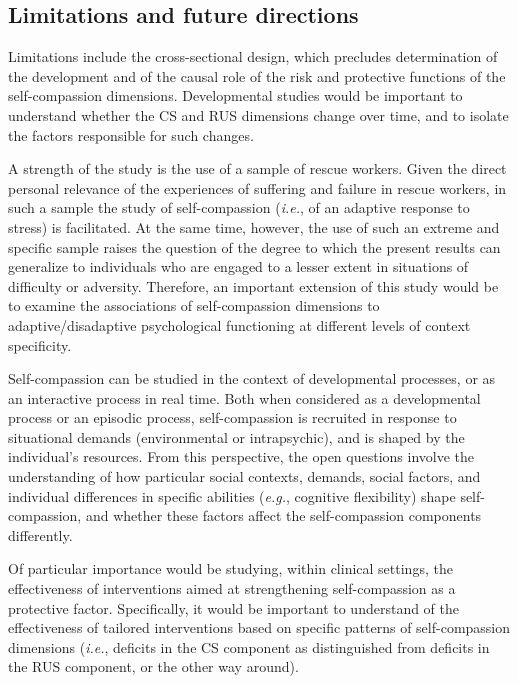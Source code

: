 \documentclass[
  english,
  man,floatsintext]{apa7}
\begin{document}
\hypertarget{limitations-and-future-directions}{%
\subsection{Limitations and future directions}\label{limitations-and-future-directions}}

Limitations include the cross-sectional design, which precludes determination of the development and of the causal role of the risk and protective functions of the self-compassion dimensions. Developmental studies would be important to understand whether the CS and RUS dimensions change over time, and to isolate the factors responsible for such changes.

A strength of the study is the use of a sample of rescue workers. Given the direct personal relevance of the experiences of suffering and failure in rescue workers, in such a sample the study of self-compassion (\emph{i.e.}, of an adaptive response to stress) is facilitated. At the same time, however, the use of such an extreme and specific sample raises the question of the degree to which the present results can generalize to individuals who are engaged to a lesser extent in situations of difficulty or adversity. Therefore, an important extension of this study would be to examine the associations of self-compassion dimensions to adaptive/disadaptive psychological functioning at different levels of context specificity.

Self-compassion can be studied in the context of developmental processes, or as an interactive process in real time. Both when considered as a developmental process or an episodic process, self-compassion is recruited in response to situational demands (environmental or intrapsychic), and is shaped by the individual's resources. From this perspective, the open questions involve the understanding of how particular social contexts, demands, social factors, and individual differences in specific abilities (\emph{e.g.}, cognitive flexibility) shape self-compassion, and whether these factors affect the self-compassion components differently.

Of particular importance would be studying, within clinical settings, the effectiveness of interventions aimed at strengthening self-compassion as a protective factor. Specifically, it would be important to understand of the effectiveness of tailored interventions based on specific patterns of self-compassion dimensions (\emph{i.e.}, deficits in the CS component as distinguished from deficits in the RUS component, or the other way around).
\end{document}
